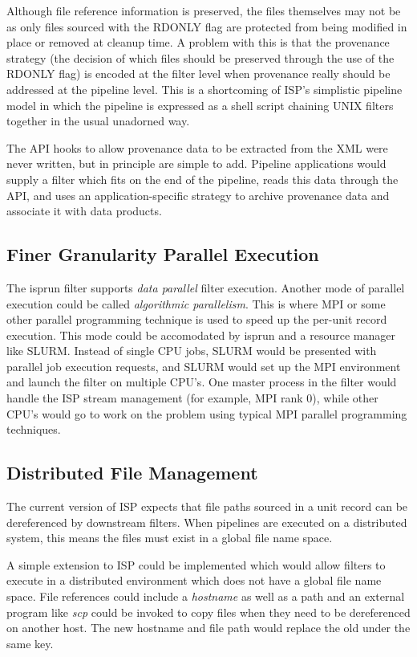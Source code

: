 \documentclass{article}
\begin{document}
Although file reference information is preserved, the files themselves may 
not be as only files sourced with the RDONLY flag are protected from being 
modified in place or removed at cleanup time.  A problem with this is that 
the provenance strategy (the decision of which files should be preserved 
through the use of the RDONLY flag) is encoded
at the filter level when provenance really should be addressed at the pipeline
level.  This is a shortcoming of ISP's simplistic pipeline model in which
the pipeline is expressed as a shell script chaining UNIX filters together
in the usual unadorned way.

The API hooks to allow provenance data to be extracted from the XML
were never written, but in principle are simple to add.  Pipeline applications
would supply a filter which fits on the end of the pipeline, reads this
data through the API, and uses an application-specific strategy to archive
provenance data and associate it with data products.

\subsection{Finer Granularity Parallel Execution}\label{secparallelfuture}

The isprun filter supports {\em data parallel} filter execution.
Another mode of parallel execution could be called {\em algorithmic 
parallelism}.  This is where MPI or some other parallel programming technique
is used to speed up the per-unit record execution.
This mode could be accomodated by isprun and a resource manager
like SLURM.  Instead of single CPU jobs, SLURM would be presented with
parallel job execution requests, and SLURM would set up the MPI environment
and launch the filter on multiple CPU's.  One master process in the
filter would handle the ISP stream management (for example, MPI rank 0), 
while other CPU's would go to work on the problem
using typical MPI parallel programming techniques.  

\subsection{Distributed File Management}

The current version of ISP expects that file paths sourced in a unit record
can be dereferenced by downstream filters.  When pipelines are executed
on a distributed system, this means the files must exist in a global file
name space.

A simple extension to ISP could be implemented which would allow filters
to execute in a distributed environment which does not have a global file
name space.  File references could include a {\em hostname} as well as a path
and an external program like {\em scp} could be invoked to copy files
when they need to be dereferenced on another host.  The new hostname and
file path would replace the old under the same key.
\end{document}
